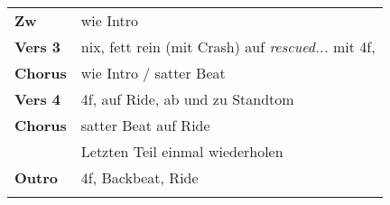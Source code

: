 \begin{tabular}{p{1.6cm}l}
	\textbf{Zw}     & wie Intro                                                                  \\
	\textbf{Vers 3} & nix, fett rein (mit Crash) auf \textit{rescued...} mit 4f,                 \\
	\textbf{Chorus} & wie Intro / satter Beat                                                    \\
	\textbf{Vers 4} & 4f, auf Ride, ab und zu Standtom                                           \\
	\textbf{Chorus} & satter Beat auf Ride                                                       \\
	                & Letzten Teil einmal wiederholen                                            \\
	\textbf{Outro}  & 4f, Backbeat, Ride                                                         \\
	                &                                                                            \\
\end{tabular}